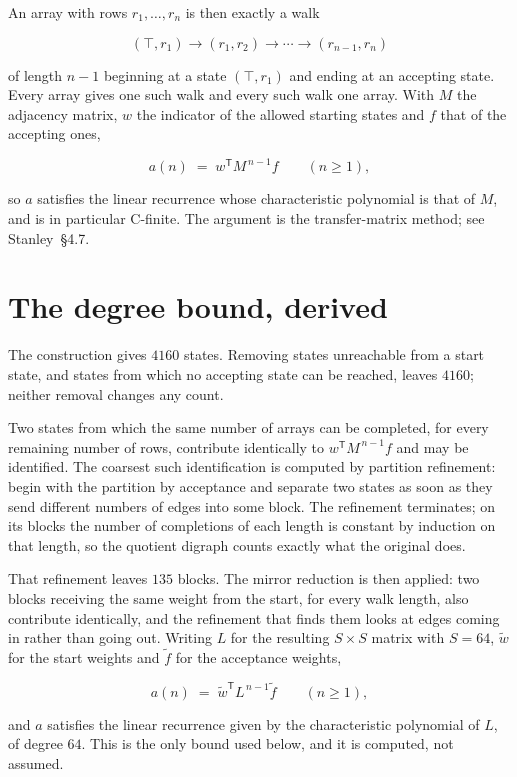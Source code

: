 \documentclass[11pt]{article}
\theoremstyle{definition}
\begin{document}
An array with rows $r_1,\dots,r_n$ is then exactly a walk

\[(\top,r_1) \to (r_1,r_2) \to \cdots \to (r_{n-1},r_n)\]

of length $n-1$ beginning at a state $(\top,r_1)$ and ending at an accepting state. Every array gives one such walk and every such walk one array. With $M$ the adjacency matrix, $w$ the indicator of the allowed starting states and $f$ that of the accepting ones,

\[a(n) \;=\; w^{\mathsf T} M^{\,n-1} f \qquad (n \ge 1),\]

so $a$ satisfies the linear recurrence whose characteristic polynomial is that of $M$, and is in particular C-finite. The argument is the transfer-matrix method; see Stanley~\S4.7.

\section{The degree bound, derived}

The construction gives $4160$ states. Removing states unreachable from a start state, and states from which no accepting state can be reached, leaves $4160$; neither removal changes any count.

Two states from which the same number of arrays can be completed, for every remaining number of rows, contribute identically to $w^{\mathsf T}M^{\,n-1}f$ and may be identified. The coarsest such identification is computed by partition refinement: begin with the partition by acceptance and separate two states as soon as they send different numbers of edges into some block. The refinement terminates; on its blocks the number of completions of each length is constant by induction on that length, so the quotient digraph counts exactly what the original does.

That refinement leaves $135$ blocks. The mirror reduction is then applied: two blocks receiving the same weight from the start, for every walk length, also contribute identically, and the refinement that finds them looks at edges coming in rather than going out. Writing $L$ for the resulting $S \times S$ matrix with $S = 64$, $\tilde w$ for the start weights and $\tilde f$ for the acceptance weights,

\[a(n) \;=\; \tilde w^{\mathsf T} L^{\,n-1} \tilde f \qquad (n \ge 1),\]

and $a$ satisfies the linear recurrence given by the characteristic polynomial of $L$, of degree $64$. This is the only bound used below, and it is computed, not assumed.
\end{document}
